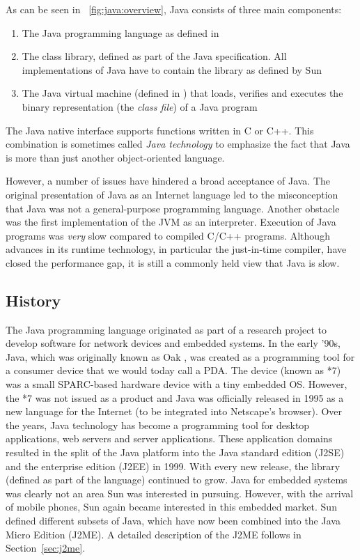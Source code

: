 %
As can be seen in \figurename~\ref{fig:java:overview}, Java consists
of three main components:
%
\begin{enumerate}
    \item The Java programming language as defined in
    \cite{JavaLangSpec2}
    \item The class library, defined as part of the Java
        specification. All implementations of Java have to
        contain the library as defined by Sun
    \item The Java virtual machine (defined in \cite{jvm}) that loads,
     verifies and executes the binary representation (the
\emph{class file}) of a Java program
\end{enumerate}
%
The Java native interface supports functions written in C or C++.
This combination is sometimes called \emph{Java technology} to
emphasize the fact that Java is more than just another
object-oriented language.

However, a number of issues have hindered a broad acceptance of
Java. The original presentation of Java as an Internet language led
to the misconception that Java was not a general-purpose programming
language. Another obstacle was the first implementation of the JVM
as an interpreter. Execution of Java programs was \emph{very} slow
compared to compiled C/C++ programs. Although advances in its
runtime technology, in particular the just-in-time compiler, have
closed the performance gap, it is still a commonly held view that
Java is slow.

\subsection{History}

The Java programming language originated as part of a research
project to develop software for network devices and embedded
systems. In the early '90s, Java, which was originally known as Oak
\cite{java:oak, java:oak2}, was created as a programming tool for a
consumer device that we would today call a PDA. The device (known as
*7) was a small SPARC-based hardware device with a tiny embedded OS.
However, the *7 was not issued as a product and Java was officially
released in 1995 as a new language for the Internet (to be
integrated into Netscape's browser). Over the years, Java technology
has become a programming tool for desktop applications, web servers
and server applications. These application domains resulted in the
split of the Java platform into the Java standard edition (J2SE) and
the enterprise edition (J2EE) in 1999. With every new release, the
library (defined as part of the language) continued to grow. Java
for embedded systems was clearly not an area Sun was interested in
pursuing. However, with the arrival of mobile phones, Sun again
became interested in this embedded market. Sun defined different
subsets of Java, which have now been combined into the Java Micro
Edition (J2ME). A detailed description of the J2ME follows in
Section~\ref{sec:j2me}.



